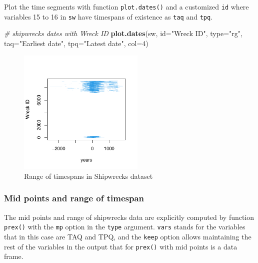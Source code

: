 \documentclass[a4paper,11pt]{memoir}
\newenvironment{Shaded}{\begin{snugshade}}{\end{snugshade}}
\newcommand{\CommentTok}[1]{\textcolor[rgb]{0.56,0.35,0.01}{\textit{#1}}}
\newcommand{\DataTypeTok}[1]{\textcolor[rgb]{0.13,0.29,0.53}{#1}}
\newcommand{\DecValTok}[1]{\textcolor[rgb]{0.00,0.00,0.81}{#1}}
\newcommand{\KeywordTok}[1]{\textcolor[rgb]{0.13,0.29,0.53}{\textbf{#1}}}
\newcommand{\NormalTok}[1]{#1}
\newcommand{\StringTok}[1]{\textcolor[rgb]{0.31,0.60,0.02}{#1}}
\begin{document}
Plot the time segments with function \texttt{plot.dates()} and a
customized \texttt{\textquotesingle{}id\textquotesingle{}} where
variables 15 to 16 in \texttt{sw} have timespans of existence as
\texttt{\textquotesingle{}taq\textquotesingle{}} and
\texttt{\textquotesingle{}tpq\textquotesingle{}}.

\begin{Shaded}
\begin{Highlighting}[]
\CommentTok{# shipwrecks dates with Wreck ID}
\KeywordTok{plot.dates}\NormalTok{(sw, }\DataTypeTok{id=}\StringTok{"Wreck ID"}\NormalTok{, }\DataTypeTok{type=}\StringTok{"rg"}\NormalTok{, }\DataTypeTok{taq=}\StringTok{"Earliest date"}\NormalTok{, }\DataTypeTok{tpq=}\StringTok{"Latest date"}\NormalTok{, }\DataTypeTok{col=}\DecValTok{4}\NormalTok{)}
\end{Highlighting}
\end{Shaded}

\begin{figure}

\centering
\includegraphics[width=6cm, trim=0 0 0 40, clip]{img/unnamed-chunk-5-1} 

\caption{Range of timespans in Shipwrecks dataset}\label{fig:unnamed-chunk-5}
\end{figure}

\hypertarget{mid-points-and-range-of-timespan}{%
\subsubsection{Mid points and range of
timespan}\label{mid-points-and-range-of-timespan}}

The mid points and range of shipwrecks data are explicitly computed by
function \texttt{prex()} with the \texttt{mp} option in the
\texttt{\textquotesingle{}type\textquotesingle{}} argument.
\texttt{\textquotesingle{}vars\textquotesingle{}} stands for the
variables that in this case are TAQ and TPQ, and the
\texttt{\textquotesingle{}keep\textquotesingle{}} option allows
maintaining the rest of the variables in the output that for
\texttt{prex()} with mid points is a data frame.
\end{document}
